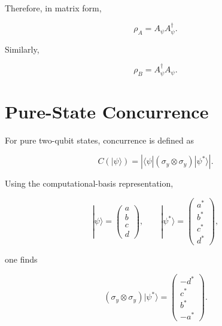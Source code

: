 Therefore, in matrix form,

\begin{equation}
\rho_A
=
A_\psi A_\psi^\dagger.
\label{eq:rhoA_coefficient_matrix_relation}
\end{equation}

Similarly,

\begin{equation}
\rho_B
=
A_\psi^\dagger A_\psi.
\label{eq:rhoB_coefficient_matrix_relation}
\end{equation}


\section*{Pure-State Concurrence}

For pure two-qubit states, concurrence is defined as

\begin{equation}
C(|\psi\rangle)
=
\left|
\langle \psi |
(\sigma_y \otimes \sigma_y)
|\psi^*\rangle
\right|.
\label{eq:pure_state_concurrence_definition}
\end{equation}

Using the computational-basis representation,

\begin{equation}
|\psi\rangle
=
\begin{pmatrix}
a\\
b\\
c\\
d
\end{pmatrix},
\qquad
|\psi^*\rangle
=
\begin{pmatrix}
a^*\\
b^*\\
c^*\\
d^*
\end{pmatrix},
\label{eq:computational_basis_state_vectors}
\end{equation}

one finds

\begin{equation}
(\sigma_y \otimes \sigma_y)
|\psi^*\rangle
=
\begin{pmatrix}
- d^*\\
c^*\\
b^*\\
- a^*
\end{pmatrix}.
\label{eq:spin_flip_action}
\end{equation}

